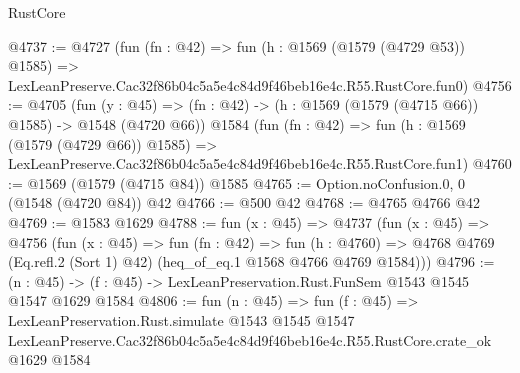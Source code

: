 \begin{lexlean}{RustCore}
\begin{coremodule}
@4737 := @4727
    (fun (fn : @42) =>
    fun (h : @1569 (@1579 (@4729 @53)) @1585) =>
    LexLeanPreserve.Cac32f86b04c5a5e4c84d9f46beb16e4c.R55.RustCore.fun0)
@4756 := @4705
    (fun (y : @45) => (fn : @42) -> (h : @1569 (@1579 (@4715 @66)) @1585) -> @1548 (@4720 @66))
    @1584
    (fun (fn : @42) =>
    fun (h : @1569 (@1579 (@4729 @66)) @1585) =>
    LexLeanPreserve.Cac32f86b04c5a5e4c84d9f46beb16e4c.R55.RustCore.fun1)
@4760 := @1569 (@1579 (@4715 @84)) @1585
@4765 := Option.noConfusion.{0, 0} (@1548 (@4720 @84)) @42
@4766 := @500 @42
@4768 := @4765 @4766 @42
@4769 := @1583 @1629
@4788 := fun (x : @45) =>
  @4737
    (fun (x : @45) =>
    @4756
      (fun (x : @45) =>
      fun (fn : @42) =>
      fun (h : @4760) =>
      @4768 @4769 (Eq.refl.{2} (Sort 1) @42) (heq_of_eq.{1} @1568 @4766 @4769 @1584)))
@4796 := (n : @45) -> (f : @45) -> LexLeanPreservation.Rust.FunSem @1543 @1545 @1547 @1629 @1584
@4806 := fun (n : @45) =>
  fun (f : @45) =>
  LexLeanPreservation.Rust.simulate
    @1543
    @1545
    @1547
    LexLeanPreserve.Cac32f86b04c5a5e4c84d9f46beb16e4c.R55.RustCore.crate_ok
    @1629
    @1584
\end{coremodule}
\end{lexlean}
